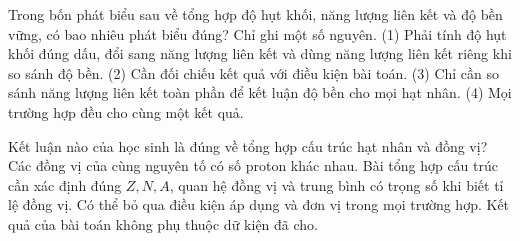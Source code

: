 \begin{ex}
Trong bốn phát biểu sau về tổng hợp độ hụt khối, năng lượng liên kết và độ bền vững, có bao nhiêu phát biểu đúng? Chỉ ghi một số nguyên. (1) Phải tính độ hụt khối đúng dấu, đổi sang năng lượng liên kết và dùng năng lượng liên kết riêng khi so sánh độ bền. (2) Cần đối chiếu kết quả với điều kiện bài toán. (3) Chỉ cần so sánh năng lượng liên kết toàn phần để kết luận độ bền cho mọi hạt nhân. (4) Mọi trường hợp đều cho cùng một kết quả.
\end{ex}

\begin{ex}
Kết luận nào của học sinh là đúng về tổng hợp cấu trúc hạt nhân và đồng vị?
\choice
{Các đồng vị của cùng nguyên tố có số proton khác nhau.}
{\True Bài tổng hợp cấu trúc cần xác định đúng $Z,N,A$, quan hệ đồng vị và trung bình có trọng số khi biết tỉ lệ đồng vị.}
{Có thể bỏ qua điều kiện áp dụng và đơn vị trong mọi trường hợp.}
{Kết quả của bài toán không phụ thuộc dữ kiện đã cho.}
\end{ex}

